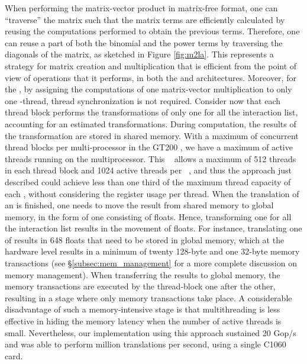 When performing the matrix-vector product in matrix-free format, one can ``traverse'' the matrix such that the matrix terms are efficiently calculated by reusing the computations performed to obtain the previous terms. Therefore, one can reuse a part of both the binomial and the power terms by traversing the diagonals of the matrix, as sketched in Figure \ref{fig:m2la}.  This represents a strategy for matrix creation and multiplication that is efficient from the point of view of operations that it performs, in both the {\gpu} and {\cpu} architectures.  Moreover, for the {\gpu}, by assigning the computations of one matrix-vector multiplication to only one {\cuda}-thread, thread synchronization is not required. Consider now that each thread block performs the transformations of only one {\ME} for all the interaction list, accounting for an estimated  {\ML} transformations. During computation, the results of the transformation are stored in shared memory. With a maximum  of  concurrent thread blocks per multi-processor in the GT200 \gpu, we have a maximum of  active threads running on the multiprocessor.  This \NV\ {\gpu} allows a maximum of 512 threads in each thread block and 1024 active threads per {\sm}~\cite[][p.\,8]{cuda-guide}, and thus the approach just described could achieve less than one third of the maximum thread capacity of each {\sm}, without considering the register usage per thread. 
When the translation of an {\ME} is finished, one needs to move the result from shared memory to global memory, in the form of one {\LE} consisting of  floats. Hence, transforming one {\ME} for all the interaction list results in the movement of  floats. 
For instance, translating one {\ME} of  results in 648 floats that need to be stored in global memory, which at the hardware level results in  a minimum of twenty 128-byte and one 32-byte memory transactions (see \S\ref{subsec:mem_management} for a more complete discussion on memory management). When transferring the results to global memory, the memory transactions are executed by the thread-block one after the other, resulting in a stage where only memory transactions take place. A considerable disadvantage of such a memory-intensive stage is that multithreading is less effective in hiding the  memory latency when the number of active threads is small. 
Nevertheless, our implementation using this approach sustained 20 Gop/s and was able to perform  million translations per second, using a single C1060 {\tesla} card. 

\medskip

